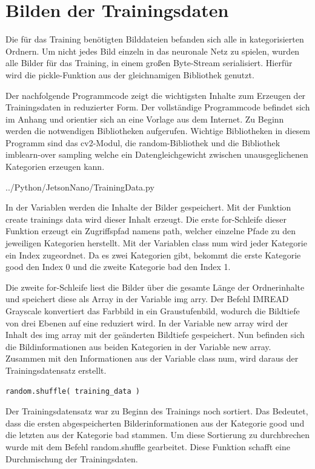 \section{Bilden der Trainingsdaten}

Die für das Training benötigten Bilddateien befanden sich alle in kategorisierten Ordnern.
Um nicht jedes Bild einzeln in das neuronale Netz zu spielen, wurden alle Bilder für das
Training, in einem großen Byte-Stream serialisiert. Hierfür wird die pickle-Funktion aus
der gleichnamigen Bibliothek genutzt.

Der nachfolgende Programmcode zeigt die wichtigsten Inhalte zum Erzeugen der Trainingsdaten 
in reduzierter Form. Der vollständige Programmcode befindet sich im Anhang
und orientier sich an eine Vorlage aus dem Internet. \cite{sentdex:2018} Zu Beginn werden die 
notwendigen Bibliotheken aufgerufen. Wichtige Bibliotheken in diesem Programm sind das
cv2-Modul, die random-Bibliothek und die Bibliothek imblearn-over sampling welche ein
Datengleichgewicht zwischen unausgeglichenen Kategorien erzeugen kann.


{../Python/JetsonNano/TrainingData.py}

In der Variablen  werden die Inhalte der Bilder gespeichert. Mit der 
Funktion create trainings data wird dieser Inhalt erzeugt. Die erste for-Schleife dieser Funktion
erzeugt ein Zugriffspfad namens path, welcher einzelne Pfade zu den jeweiligen Kategorien 
herstellt. Mit der Variablen class num wird jeder Kategorie ein Index zugeordnet. Da
es zwei Kategorien gibt, bekommt die erste Kategorie good den Index 0 und die zweite
Kategorie bad den Index 1.

Die zweite for-Schleife liest die Bilder über die gesamte Länge der Ordnerinhalte und
speichert diese als Array in der Variable img arry. Der Befehl IMREAD Grayscale konvertiert
das Farbbild in ein Graustufenbild, wodurch die Bildtiefe von drei Ebenen auf eine reduziert 
wird. In der Variable new array wird der Inhalt des img array mit der geänderten
Bildtiefe gespeichert. Nun befinden sich die Bildinformationen aus beiden Kategorien in
der Variable new array. Zusammen mit den Informationen aus der Variable class num,
wird daraus der Trainingsdatensatz erstellt.

\begin{lstlisting}
random.shuffle( training_data )
\end{lstlisting}


Der Trainingsdatensatz war zu Beginn des Trainings noch sortiert. Das Bedeutet, dass die
ersten abgespeicherten Bilderinformationen aus der Kategorie good und die letzten aus
der Kategorie bad stammen. Um diese Sortierung zu durchbrechen wurde mit dem Befehl
random.shuffle gearbeitet. Diese Funktion schafft eine Durchmischung der Trainingsdaten.

